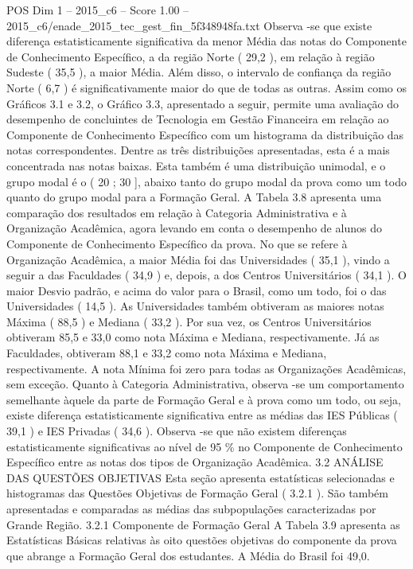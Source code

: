 \begin{textsample}{POS Dim 1 – 2015\_c6 – Score 1.00 – 2015\_c6/enade\_2015\_tec\_gest\_fin\_5f348948fa.txt}
Observa -se que existe diferença estatisticamente significativa da menor Média das notas do Componente de Conhecimento Específico, a da região Norte ( 29,2 ), em relação à região Sudeste ( 35,5 ), a maior Média.
Além disso, o intervalo de confiança da região Norte ( 6,7 ) é significativamente maior do que de todas as outras.
Assim como os Gráficos 3.1 e 3.2, o Gráfico 3.3, apresentado a seguir, permite uma avaliação do desempenho de concluintes de Tecnologia em Gestão Financeira em relação ao Componente de Conhecimento Específico com um histograma da distribuição das notas correspondentes.
Dentre as três distribuições apresentadas, esta é a mais concentrada nas notas baixas.
Esta também é uma distribuição unimodal, e o grupo modal é o ( 20 ; 30 ], abaixo tanto do grupo modal da prova como um todo quanto do grupo modal para a Formação Geral.
A Tabela 3.8 apresenta uma comparação dos resultados em relação à Categoria Administrativa e à Organização Acadêmica, agora levando em conta o desempenho de alunos do Componente de Conhecimento Específico da prova.
No que se refere à Organização Acadêmica, a maior Média foi das Universidades ( 35,1 ), vindo a seguir a das Faculdades ( 34,9 ) e, depois, a dos Centros Universitários ( 34,1 ).
O maior Desvio padrão, e acima do valor para o Brasil, como um todo, foi o das Universidades ( 14,5 ).
As Universidades também obtiveram as maiores notas Máxima ( 88,5 ) e Mediana ( 33,2 ).
Por sua vez, os Centros Universitários obtiveram 85,5 e 33,0 como nota Máxima e Mediana, respectivamente.
Já as Faculdades, obtiveram 88,1 e 33,2 como nota Máxima e Mediana, respectivamente.
A nota Mínima foi zero para todas as Organizações Acadêmicas, sem exceção.
Quanto à Categoria Administrativa, observa -se um comportamento semelhante àquele da parte de Formação Geral e à prova como um todo, ou seja, existe diferença estatisticamente significativa entre as médias das IES Públicas ( 39,1 ) e IES Privadas ( 34,6 ).
Observa -se que não existem diferenças estatisticamente significativas ao nível de 95 \% no Componente de Conhecimento Específico entre as notas dos tipos de Organização Acadêmica. 3.2 ANÁLISE DAS QUESTÕES OBJETIVAS Esta seção apresenta estatísticas selecionadas e histogramas das Questões Objetivas de Formação Geral ( 3.2.1 ).
São também apresentadas e comparadas as médias das subpopulações caracterizadas por Grande Região. 3.2.1 Componente de Formação Geral A Tabela 3.9 apresenta as Estatísticas Básicas relativas às oito questões objetivas do componente da prova que abrange a Formação Geral dos estudantes.
A Média do Brasil foi 49,0.

\end{textsample}
